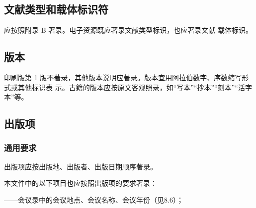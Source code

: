 \documentclass{article}
\begin{document}
\begin{refsection}
\nocite{地壳运动--}
\nocite{三松堂--}
\nocite{世界出版业--}
\nocite{ECL集成电路--}
\nocite{中国科学技术史--}
\nocite{中国科学--}
\nocite{AsianPacificjournal--}

{}
\end{refsection}


\subsection{文献类型和载体标识符}

应按照附录 B 著录。电子资源既应著录文献类型标识，也应著录文献
载体标识。

\begin{refsection}
\nocite{马寅初讲义--}
\nocite{商鞅战秋菊--}
\nocite{严复思想--}
\nocite{中子反射--}
\nocite{信息与文献--}
\nocite{智能戒指--}
\nocite{Quantumfield--}

{}
\end{refsection}

\subsection{版本}

印刷版第 1 版不著录，其他版本说明应著录。版本宜用阿拉伯数字、序数缩写形式或其他标识表
示。古籍的版本应按原文客观照录，如“写本”“抄本”“刻本”“活字本”等。


\begin{refsection}
\nocite{egbookeda--}
\nocite{egbookedb--}
\nocite{egbookedc--,egbookedf--}
\nocite{egbookedd--}
\nocite{egbookede--}
{}
\end{refsection}

\subsection{出版项}

\subsubsection{通用要求}

出版项应按出版地、出版者、出版日期顺序著录。

本文件中的以下项目也应按照出版项的要求著录：

——会议录中的会议地点、会议名称、会议年份（见8.6）；
\end{document}
